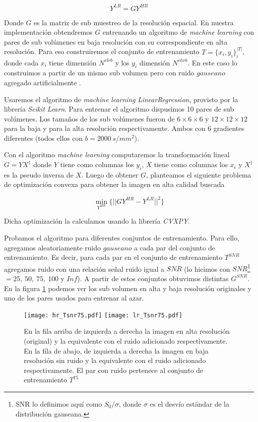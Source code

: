 \documentclass[a4paper,10pt]{article}%
\begin{document}
$$  Y^{LR} = GY^{HR}$$

Donde $G$ es la matriz de sub muestreo de la resolución espacial. En 
nuestra implementación obtendremos $G$ entrenando un algoritmo de 
\textit{machine learning} con pares de sub volúmenes en baja resolución con su 
correspondiente en alta resolución. Para eso construiremos el conjunto de 
entrenamiento $T=\{x_i, y_i\}_{i}^{|T|}$, donde cada $x_i$ tiene dimensión $N^{vlrb}$ y los $y_i$ 
dimensión $N^{vhrb}$. En este caso lo construimos a partir de un 
mismo sub volumen pero con ruido $gauseano$ agregado artificialmente .


Usaremos el algoritmo de \textit{machine learning} \textit{LinearRegression},
provisto por 
la librer\'ia \textit{Scikit Learn}. Para entrenar el algoritmo dispusimos 10 
pares de sub vol\'umenes. Los tama\~nos de los sub 
vol\'umenes fueron de $6\times6\times6$ y $12\times12\times12$ para la baja y 
para la alta resolución respectivamente. Ambos con 6 gradientes diferentes 
(todos ellos con $b=2000\ s/mm^2$).



Con el algoritmo \textit{machine learning} computaremos la transformación 
lineal $G=YX^{\dagger}$ donde $Y$ tiene como columnas los $y_i$, $X$ tiene como 
columnas los $x_i$ y $X^{\dagger}$ es la pseudo inversa de $X$.
Luego de obtener $G$, planteamos el siguiente problema de optimización convexa 
para obtener la imagen en alta calidad buscada

$$  \min_{Y^{HR}} \{ || G Y^{HR} - Y^{LR} ||^2  \}$$

Dicha optimización la calculamos usando la librería \textit{CVXPY}.

Probamos el algoritmo para diferentes conjuntos de entrenamiento. Para 
ello, agregamos aleatoriamente ruido $gauseano$ a cada par del conjunto de 
entrenamiento. Es decir, para cada par en el conjunto de entrenamiento 
$T^{SNR}$ agregamos ruido con una relación señal ruido igual a $SNR$ (lo 
hicimos con $SNR$\footnote{SNR lo definimos aquí como $S_0/\sigma $, 
donde $\sigma$ es el desvío estándar de la distribución gauseana.}$= 25,\ 50,\ 
75,\ 100$ y $Inf$). A partir de estos conjuntos obtuvimos distintas $G^{SNR}$. 
En la figura \ref{snr_lr_hr} podemos ver los sub volumen en alta y baja 
resolución originales y uno de los pares usados para entrenar al azar. 

\begin{figure}[H]
\centering
\texttt{[image: hr\_Tsnr75.pdf]}
\texttt{[image: lr\_Tsnr75.pdf]}
\caption{En la fila arriba de izquierda a derecha la imagen en alta 
resolución (original) y la equivalente con el ruido adicionado respectivamente. 
En la fila de abajo, de izquierda a derecha la imagen en baja resolución 
sin ruido y la equivalente con el ruido adicionado 
respectivamente. El par con ruido pertenece al conjunto de entrenamiento 
$T^{75}$} 
\label{snr_lr_hr}
\end{figure}%
\end{document}
